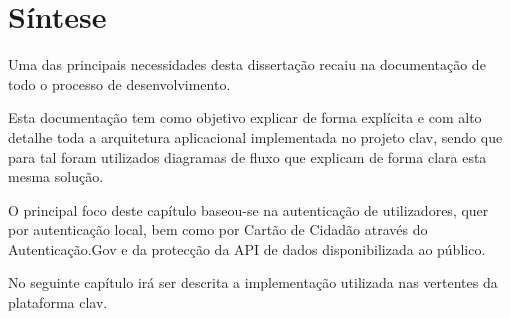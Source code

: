 \cleardoublepage
\section{Síntese}

Uma das principais necessidades desta dissertação recaiu na documentação de todo o processo de desenvolvimento. 

Esta documentação tem como objetivo explicar de forma explícita e com alto detalhe toda a arquitetura aplicacional implementada no projeto \gls{clav}, sendo que para tal foram utilizados diagramas de fluxo que explicam de forma clara esta mesma solução.

O principal foco deste capítulo baseou-se na autenticação de utilizadores, quer por autenticação local, bem como por Cartão de Cidadão através do Autenticação.Gov e da protecção da API de dados disponibilizada ao público.

No seguinte capítulo irá ser descrita a implementação utilizada nas vertentes da plataforma \gls{clav}.
